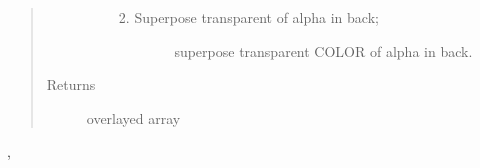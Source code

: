 \documentclass[letterpaper,10pt,english]{sphinxmanual}
\begin{document}
\begin{fulllineitems}
\begin{quote}
\begin{description}
\begin{itemize}
\begin{enumerate}
\begin{description}
\end{description}

\item {} \begin{description}
\item[{Superpose transparent of alpha in back;}] \leavevmode
superpose transparent COLOR of alpha in back.

\end{description}

\end{enumerate}


\end{itemize}

\item[{Returns}] \leavevmode
overlayed array

\end{description}\end{quote}




{\hyperref[RRtoolbox.lib.arrayops:RRtoolbox.lib.arrayops.basic.overlay]{\emph{}}}, {\hyperref[RRtoolbox.lib.arrayops:RRtoolbox.lib.arrayops.basic.overlay2]{\emph{}}}



\end{fulllineitems}

\end{document}
